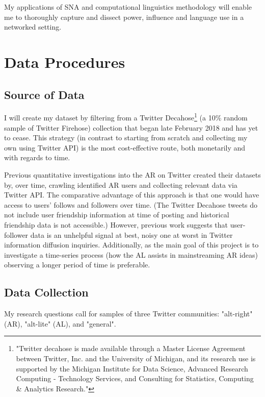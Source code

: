 \documentclass[acmlarge, screen, authorversion]{acmart}
\begin{document}
My applications of SNA and computational linguistics methodology will enable me to thoroughly capture and dissect power, influence and language use in a networked setting.

\section{Data Procedures}

\subsection{Source of Data}

I will create my dataset by filtering from a Twitter Decahose\footnote{"Twitter
decahose is made available through a Master License Agreement between Twitter,
Inc. and the University of Michigan, and its research use is supported by the
Michigan Institute for Data Science, Advanced Research Computing - Technology
Services, and Consulting for Statistics, Computing \& Analytics Research."} (a
10\% random sample of Twitter Firehose) collection that began late February 2018
and has yet to cease. This strategy (in contrast to starting from scratch and
collecting my own using Twitter API) is the most cost-effective route, both
monetarily and with regards to time.

Previous quantitative investigations into the AR on Twitter
\cite{bergerAltrightTwitterCensus2018, alizadehPsychologyMoralityPolitical2019} created their datasets by, over
time, crawling identified AR users and collecting relevant data via Twitter API.
The comparative advantage of this approach is that one would have access to
users' follows and followers over time. (The Twitter Decahose tweets do not
include user friendship information at time of posting and historical friendship
data is not accessible.) However, previous work
\cite{chaMeasuringUserInfluence2010,
versteegInformationtheoreticMeasuresInfluence2013} suggests that user-follower
data is an unhelpful signal at best, noisy one at worst in Twitter information
diffusion inquiries. Additionally, as the main goal of this project is to
investigate a time-series process (how the AL assists in mainstreaming AR ideas)
observing a longer period of time is preferable.

\subsection{Data Collection}

My research questions call for samples of three Twitter communities: "alt-right" (AR), "alt-lite" (AL), and "general".
\end{document}
